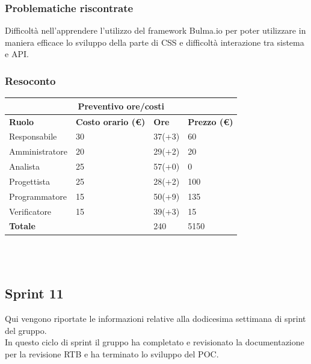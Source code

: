 \documentclass[10pt]{article}
\begin{document}
\subsubsection{Problematiche riscontrate}
Difficoltà nell’apprendere l’utilizzo del framework Bulma.io per poter utilizzare in maniera efficace lo sviluppo della parte di CSS e difficoltà interazione tra sistema e API.


\subsubsection{Resoconto}
\begin{center}
	\begin{tabularx}{\textwidth}{|X|X|X|X|}
		\hline
		\multicolumn{4}{|c|}{\textbf{Preventivo ore/costi}}                                      \\
		\hline
		\hline
		\textbf{Ruolo}  & \textbf{Costo orario (\euro)} & \textbf{Ore} & \textbf{Prezzo (\euro)} \\
		\hline
		Responsabile    & 30                            & 37(+3)       & 60                      \\
		\hline
		Amministratore  & 20                            & 29(+2)       & 20                      \\
		\hline
		Analista        & 25                            & 57(+0)       & 0                       \\
		\hline
		Progettista     & 25                            & 28(+2)       & 100                     \\
		\hline
		Programmatore   & 15                            & 50(+9)       & 135                     \\
		\hline
		Verificatore    & 15                            & 39(+3)       & 15                      \\
		\hline
		\hline
		\textbf{Totale} &                               & 240          & 5150                    \\
		\hline
	\end{tabularx}\\[8pt]
	\mbox{}\\
\end{center}

\subsection{Sprint 11}
Qui vengono riportate le informazioni relative alla dodicesima settimana di sprint del gruppo. \\
In questo ciclo di sprint il gruppo ha completato e revisionato la documentazione per la revisione RTB e ha terminato lo sviluppo del POC. \\
\end{document}
